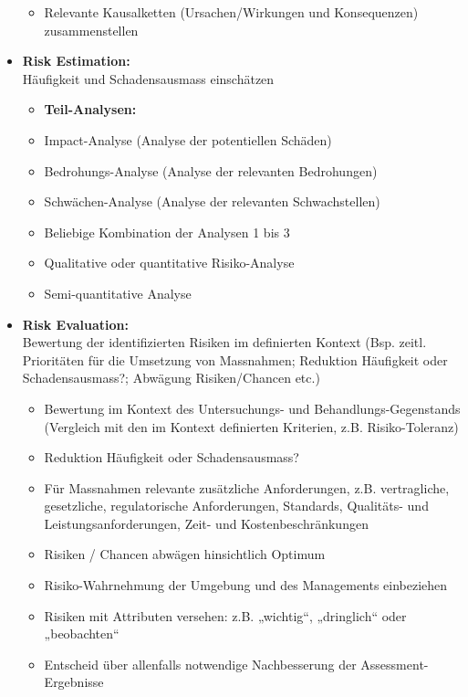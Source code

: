\documentclass[10pt,a4paper]{article}
\begin{document}
\begin{itemize}[noitemsep,topsep=0pt,leftmargin=*]
\begin{itemize}[noitemsep,topsep=0pt,leftmargin=*]
        \item Relevante Kausalketten (Ursachen/Wirkungen und Konsequenzen) zusammenstellen
    \end{itemize}
    \item \textbf{Risk Estimation:}\\Häufigkeit und Schadensausmass
    einschätzen
    \begin{itemize}[noitemsep,topsep=0pt,leftmargin=*]
        \item \textbf{Teil-Analysen:}
        \item Impact-Analyse (Analyse der potentiellen Schäden)
        \item Bedrohungs-Analyse (Analyse der relevanten Bedrohungen)
        \item Schwächen-Analyse (Analyse der relevanten Schwachstellen)
        \item Beliebige Kombination der Analysen 1 bis 3
        \item Qualitative oder quantitative Risiko-Analyse
        \item Semi-quantitative Analyse
    \end{itemize}
    \item \textbf{Risk Evaluation:}\\Bewertung der identifizierten Risiken im
    definierten Kontext (Bsp. zeitl. Prioritäten für die
    Umsetzung von Massnahmen; Reduktion Häufigkeit oder
    Schadensausmass?; Abwägung Risiken/Chancen etc.)
    \begin{itemize}[noitemsep,topsep=0pt,leftmargin=*]
        \item Bewertung im Kontext des Untersuchungs- und Behandlungs-Gegenstands (Vergleich mit den im Kontext definierten Kriterien, z.B. Risiko-Toleranz)
        \item Reduktion Häufigkeit oder Schadensausmass?
        \item Für Massnahmen relevante zusätzliche Anforderungen, z.B. vertragliche, gesetzliche, regulatorische Anforderungen, Standards, Qualitäts- und Leistungsanforderungen, Zeit- und Kostenbeschränkungen
        \item Risiken / Chancen abwägen hinsichtlich Optimum
        \item Risiko-Wahrnehmung der Umgebung und des Managements einbeziehen
        \item Risiken mit Attributen versehen: z.B. „wichtig“, „dringlich“ oder „beobachten“
        \item Entscheid über allenfalls notwendige Nachbesserung der Assessment-Ergebnisse

\end{itemize}
\end{itemize}
\end{document}
